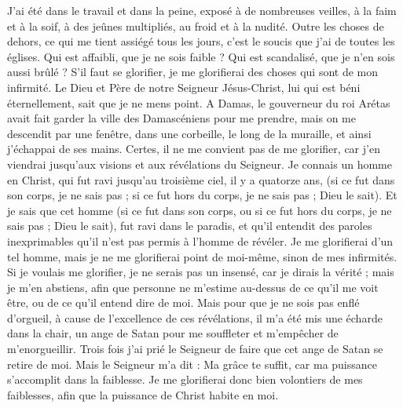 \begin{multicols}{2}
J’ai été dans le travail et dans la peine, exposé à de nombreuses veilles, à la faim et à la soif, à des jeûnes multipliés, au froid et à la nudité.
Outre les choses de dehors, ce qui me tient assiégé tous les jours, c'est le soucis que j'ai de toutes les églises.
Qui est affaibli, que je ne sois faible ? Qui est scandalisé, que je n'en sois aussi brûlé ?
S'il faut se glorifier, je me glorifierai des choses qui sont de mon infirmité.
Le Dieu et Père de notre Seigneur Jésus-Christ, lui qui est béni éternellement, sait que je ne mens point.
A Damas, le gouverneur du roi Arétas avait fait garder la ville des Damascéniens pour me prendre,
mais on me descendit par une fenêtre, dans une corbeille, le long de la muraille, et ainsi j'échappai de ses mains.
\VerseOne{}Certes, il ne me convient pas de me glorifier, car j’en viendrai jusqu’aux visions et aux révélations du Seigneur.
Je connais un homme en Christ, qui fut ravi jusqu’au troisième ciel, il y a quatorze ans, (si ce fut dans son corps, je ne sais pas ; si ce fut hors du corps, je ne sais pas ; Dieu le sait).
Et je sais que cet homme (si ce fut dans son corps, ou si ce fut hors du corps, je ne sais pas ; Dieu le sait),
fut ravi dans le paradis, et qu’il entendit des paroles inexprimables qu'il n'est pas permis à l'homme de révéler.
Je me glorifierai d'un tel homme, mais je ne me glorifierai point de moi-même, sinon de mes infirmités.
Si je voulais me glorifier, je ne serais pas un insensé, car je dirais la vérité ; mais je m'en abstiens, afin que personne ne m'estime au-dessus de ce qu'il me voit être, ou de ce qu'il entend dire de moi.
Mais pour que je ne sois pas enflé d’orgueil, à cause de l'excellence de ces révélations, il m'a été mis une écharde dans la chair, un ange de Satan pour me souffleter et m’empêcher de m’enorgueillir.
Trois fois j'ai prié le Seigneur de faire que cet ange de Satan se retire de moi.
Mais le Seigneur m'a dit : Ma grâce te suffit, car ma puissance s’accomplit dans la faiblesse. Je me glorifierai donc bien volontiers de mes faiblesses, afin que la puissance de Christ habite en moi.

\end{multicols}
